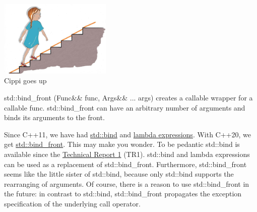\begin{center}
\includegraphics[width=0.4\textwidth]{content/3/chapter5/images/32.png}\\
Cippi goes up
\end{center}


std::bind\_front (Func\&\& func, Args\&\& ... args) creates a callable wrapper for a callable func. std::bind\_front can have an arbitrary number of arguments and binds its arguments to the front.

\begin{tcolorbox}[breakable,enhanced jigsaw,colback=blue!5!white,colframe=blue!75!black,title={std::bind\_front versus std::bind}]
	
Since C++11, we have had \href{https://en.cppreference.com/w/cpp/utility/functional/bind}{std::bind} and \href{https://en.cppreference.com/w/cpp/language/lambda}{lambda expressions}. With C++20, we get \href{https://en.cppreference.com/w/cpp/utility/functional/bind_front}{std::bind\_front}. This may make you wonder. To be pedantic std::bind is available since the \href{https://en.wikipedia.org/wiki/C%2B%2B_Technical_Report_1}{Technical Report 1} (TR1). std::bind and lambda expressions can be used as a replacement of std::bind\_front. Furthermore, std::bind\_front seems like the little sister of std::bind, because only std::bind supports the rearranging of arguments. Of course, there is a reason to use std::bind\_front in the future: in contrast to std::bind, std::bind\_front propagates the exception specification of the underlying call operator.
	
\end{tcolorbox}

